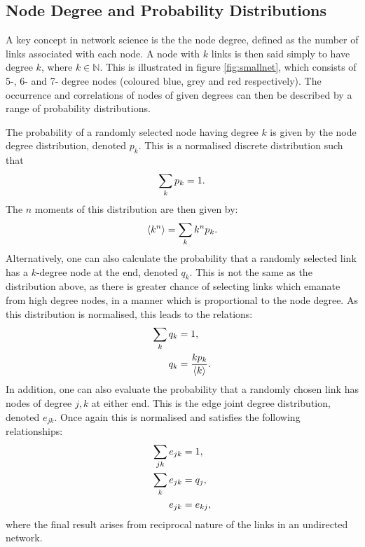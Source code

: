 \subsection{Node Degree and Probability Distributions} 
\label{s:theorynodeprob}

A key concept in network science is the the node degree, defined as the number of links associated with each node.
A node with $k$ links is then said simply to have degree $k$, where $k\in\mathbb{N}$.
This is illustrated in figure \ref{fig:smallnet}, which consists of 5\--, 6\-- and 7\-- degree nodes (coloured blue, grey and red respectively).
The occurrence and correlations of nodes of given degrees can then be described by a range of probability distributions.

The probability of a randomly selected node having degree $k$ is given by the node degree distribution, denoted $p_k$.
This is a normalised discrete distribution such that
\begin{equation}
	\label{eq:pknorm}
	\sum\limits_k p_k = 1.
\end{equation}
The $n$\th{} moments of this distribution are then given by:
\begin{equation}
	\label{eq:pkmoment}
	\langle k^{n} \rangle = \sum\limits_k k^np_k.
\end{equation}
Alternatively, one can also calculate the probability that a randomly selected link has a $k$\--degree node at the end, denoted $q_k$.
This is not the same as the distribution above, as there is greater chance of selecting links which emanate from high degree nodes, in a manner which is proportional to the node degree.
As this distribution is normalised, this leads to the relations:
\begin{align}
	\sum\limits_k q_k &= 1, \label{eq:qknorm} \\
	q_k &= \frac{kp_k}{\langle k \rangle} \label{eq:qkpk}.
\end{align}
In addition, one can also evaluate the probability that a randomly chosen link has nodes of degree $j,k$ at either end.
This is the edge joint degree distribution, denoted $e_{jk}$. 
Once again this is normalised and satisfies the following relationships:
\begin{align}
	\sum\limits_{jk} e_{jk} &= 1, \label{eq:ejknorm} \\
	\sum\limits_k e_{jk} &= q_j, \label{eq:ejkqk} \\
	e_{jk} &= e_{kj} \label{eq:ejkekj},
\end{align}
where the final result arises from reciprocal nature of the links in an undirected network.
